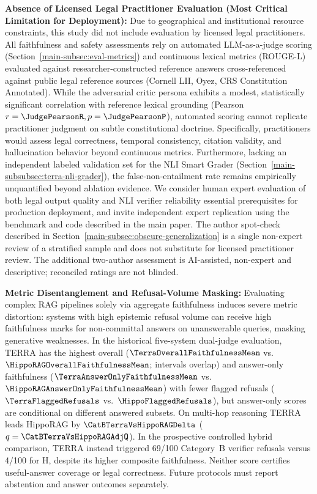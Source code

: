 \item \textbf{Absence of Licensed Legal Practitioner Evaluation (Most Critical Limitation for Deployment):} Due to geographical and institutional resource constraints, this study did not include evaluation by licensed legal practitioners. All faithfulness and safety assessments rely on automated LLM-as-a-judge scoring (Section~\ref{main-subsec:eval-metrics}) and continuous lexical metrics (ROUGE-L) evaluated against researcher-constructed reference answers cross-referenced against public legal reference sources (Cornell LII, Oyez, CRS Constitution Annotated). While the adversarial critic persona exhibits a modest, statistically significant correlation with reference lexical grounding (Pearson $r = \JudgePearsonR, p = \JudgePearsonP$), automated scoring cannot replicate practitioner judgment on subtle constitutional doctrine. Specifically, practitioners would assess legal correctness, temporal consistency, citation validity, and hallucination behavior beyond continuous metrics. Furthermore, lacking an independent labeled validation set for the NLI Smart Grader (Section~\ref{main-subsubsec:terra-nli-grader}), the false-non-entailment rate remains empirically unquantified beyond ablation evidence. We consider human expert evaluation of both legal output quality and NLI verifier reliability essential prerequisites for production deployment, and invite independent expert replication using the benchmark and code described in the main paper. The author spot-check described in Section~\ref{main-subsec:obscure-generalization} is a single non-expert review of a stratified sample and does not substitute for licensed practitioner review. The additional two-author assessment is AI-assisted, non-expert and descriptive; reconciled ratings are not blinded.

\item \textbf{Metric Disentanglement and Refusal-Volume Masking:} Evaluating complex RAG pipelines solely via aggregate faithfulness induces severe metric distortion: systems with high epistemic refusal volume can receive high faithfulness marks for non-committal answers on unanswerable queries, masking generative weaknesses. In the historical five-system dual-judge evaluation, TERRA has the highest overall ($\TerraOverallFaithfulnessMean$ vs.\ $\HippoRAGOverallFaithfulnessMean$; intervals overlap) and answer-only faithfulness ($\TerraAnswerOnlyFaithfulnessMean$ vs.\ $\HippoRAGAnswerOnlyFaithfulnessMean$) with fewer flagged refusals ($\TerraFlaggedRefusals$ vs.\ $\HippoFlaggedRefusals$), but answer-only scores are conditional on different answered subsets. On multi-hop reasoning TERRA leads HippoRAG by $\CatBTerraVsHippoRAGDelta$ ($q=\CatBTerraVsHippoRAGAdjQ$). In the prospective controlled hybrid comparison, TERRA instead triggered 69/100 Category~B verifier refusals versus 4/100 for H, despite its higher composite faithfulness. Neither score certifies useful-answer coverage or legal correctness. Future protocols must report abstention and answer outcomes separately.

